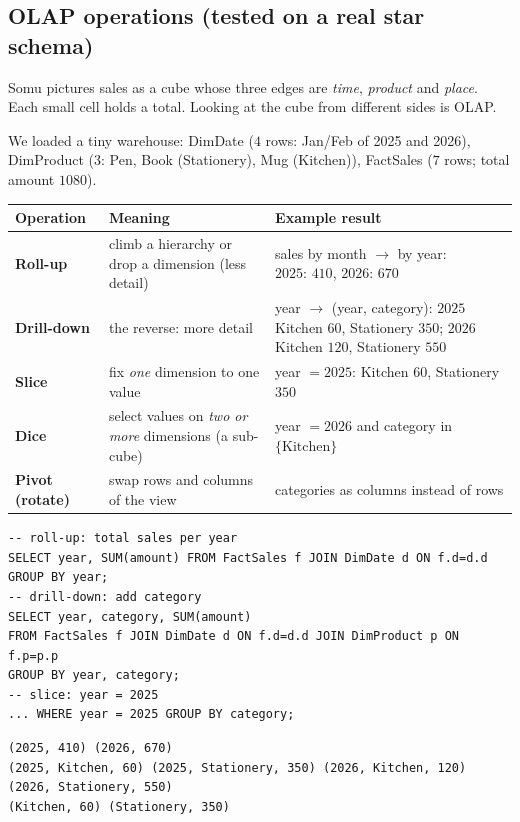 \documentclass[11pt,a4paper]{article}
\begin{document}
\subsection{OLAP operations (tested on a real star schema)}
\begin{story}
Somu pictures sales as a cube whose three edges are \emph{time}, \emph{product} and \emph{place}. Each small cell holds a total. Looking at the cube from different sides is OLAP.
\end{story}
We loaded a tiny warehouse: DimDate ($4$ rows: Jan/Feb of 2025 and 2026), DimProduct ($3$: Pen, Book (Stationery), Mug (Kitchen)), FactSales ($7$ rows; total amount $1080$).
\begin{center}
\small
\begin{tabularx}{\textwidth}{>{\raggedright\arraybackslash}p{3cm}>{\raggedright\arraybackslash}p{4.2cm}>{\raggedright\arraybackslash}X}
\toprule
\textbf{Operation} & \textbf{Meaning} & \textbf{Example result}\\
\midrule
\textbf{Roll-up} & climb a hierarchy or drop a dimension (less detail) & sales by month $\to$ by year: $2025{:}\,410$, $2026{:}\,670$\\
\textbf{Drill-down} & the reverse: more detail & year $\to$ (year, category): $2025$ Kitchen $60$, Stationery $350$; $2026$ Kitchen $120$, Stationery $550$\\
\textbf{Slice} & fix \emph{one} dimension to one value & year $=2025$: Kitchen $60$, Stationery $350$\\
\textbf{Dice} & select values on \emph{two or more} dimensions (a sub-cube) & year $=2026$ and category in $\{\text{Kitchen}\}$\\
\textbf{Pivot (rotate)} & swap rows and columns of the view & categories as columns instead of rows\\
\bottomrule
\end{tabularx}
\end{center}
\begin{lstlisting}[style=sql]
-- roll-up: total sales per year
SELECT year, SUM(amount) FROM FactSales f JOIN DimDate d ON f.d=d.d GROUP BY year;
-- drill-down: add category
SELECT year, category, SUM(amount)
FROM FactSales f JOIN DimDate d ON f.d=d.d JOIN DimProduct p ON f.p=p.p
GROUP BY year, category;
-- slice: year = 2025
... WHERE year = 2025 GROUP BY category;
\end{lstlisting}
\begin{lstlisting}[style=out]
(2025, 410) (2026, 670)
(2025, Kitchen, 60) (2025, Stationery, 350) (2026, Kitchen, 120) (2026, Stationery, 550)
(Kitchen, 60) (Stationery, 350)
\end{lstlisting}
\end{document}
